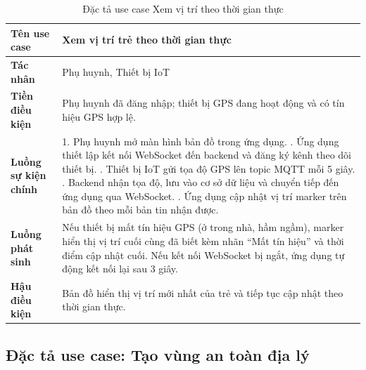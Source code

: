 \documentclass[../DoAn.tex]{subfiles}
\begin{document}
\begin{table}[H]
\centering
\caption{Đặc tả use case Xem vị trí theo thời gian thực}
\label{table:uc_realtime}
\begin{tabular}{|l|p{9.5cm}|}
\hline
\textbf{Tên use case}       & Xem vị trí trẻ theo thời gian thực \\
\hline
\textbf{Tác nhân}           & Phụ huynh, Thiết bị IoT \\
\hline
\textbf{Tiền điều kiện}     & Phụ huynh đã đăng nhập; thiết bị GPS đang hoạt động và có tín hiệu GPS hợp lệ. \\
\hline
\textbf{Luồng sự kiện chính} &
1. Phụ huynh mở màn hình bản đồ trong ứng dụng. \newline
2. Ứng dụng thiết lập kết nối WebSocket đến backend và đăng ký kênh theo dõi thiết bị. \newline
3. Thiết bị IoT gửi tọa độ GPS lên topic MQTT mỗi 5 giây. \newline
4. Backend nhận tọa độ, lưu vào cơ sở dữ liệu và chuyển tiếp đến ứng dụng qua WebSocket. \newline
5. Ứng dụng cập nhật vị trí marker trên bản đồ theo mỗi bản tin nhận được. \\
\hline
\textbf{Luồng phát sinh}    & Nếu thiết bị mất tín hiệu GPS (ở trong nhà, hầm ngầm), marker hiển thị vị trí cuối cùng đã biết kèm nhãn ``Mất tín hiệu'' và thời điểm cập nhật cuối. Nếu kết nối WebSocket bị ngắt, ứng dụng tự động kết nối lại sau 3 giây. \\
\hline
\textbf{Hậu điều kiện}      & Bản đồ hiển thị vị trí mới nhất của trẻ và tiếp tục cập nhật theo thời gian thực. \\
\hline
\end{tabular}
\end{table}

\subsection{Đặc tả use case: Tạo vùng an toàn địa lý}
\end{document}
